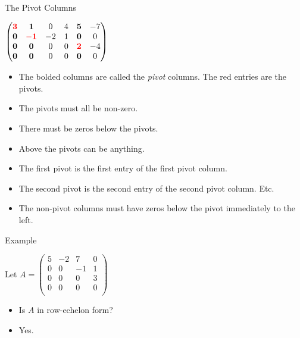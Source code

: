 \documentclass{beamer}
\begin{document}
\begin{frame}{The Pivot Columns}

$
\begin{pmatrix}
\textcolor{red}{\mathbf{3}} & \mathbf{1}                   &  0  & 4 & \mathbf{5}                  & -7 \\
\mathbf{0}                  & \textcolor{red}{\mathbf{-1}} & -2  & 1 & \mathbf{0}                  & 0  \\
\mathbf{0}                  & \mathbf{0}                   &  0  & 0 & \textcolor{red}{\mathbf{2}} & -4 \\
\mathbf{0}                  & \mathbf{0}                   &  0  & 0 & \mathbf{0}                  & 0  \\
\end{pmatrix}
$
\begin{itemize}
\item The bolded columns are called the \emph{pivot} columns. The red entries are the pivots.
\item The pivots must all be non-zero.
\item There must be zeros below the pivots.
\item Above the pivots can be anything.
\item The first pivot is the first entry of the first pivot column.
\item The second pivot is the second entry of the second pivot column. Etc.
\item The non-pivot columns must have zeros below the pivot immediately to the left.
\end{itemize}

\end{frame}


\begin{frame}{Example}

Let
$
A=
\begin{pmatrix}
5 & -2 &  7  & 0 \\
0 & 0  & -1  & 1 \\
0 & 0  &  0  & 3 \\
0 & 0  &  0  & 0 \\
\end{pmatrix}
$
\begin{itemize}
\item Is $A$ in row-echelon form?
\item Yes.
\end{itemize}

\end{frame}
\end{document}
